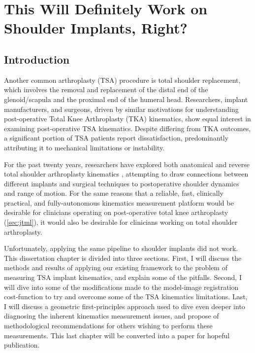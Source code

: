 \chapter{This Will Definitely Work on Shoulder Implants, Right?\protect\footnotemark}

\section{Introduction}
Another common arthroplasty (TSA) procedure is total shoulder replacement, which involves the removal and replacement of the distal end of the glenoid/scapula and the proximal end of the humeral head.
Researchers, implant manufacturers, and surgeons, driven by similar motivations for understanding post-operative Total Knee Arthroplasty (TKA) kinematics, show equal interest in examining post-operative TSA kinematics.
Despite differing from TKA outcomes, a significant portion of TSA patients report dissatisfaction, predominantly attributing it to mechanical limitations or instability.

For the past twenty years, researchers have explored both anatomical and reverse total shoulder arthroplasty kinematics \cite{kijimaVivo3dimensionalAnalysis2015,matsukiVivo3DAnalysis2014,matsukiDynamicVivoGlenohumeral2012,sugiComparingVivoThreedimensional2021,burtonFullyAutomaticTracking2023}, attempting to draw connections between different implants and surgical techniques to postoperative shoulder dynamics and range of motion.
For the same reasons that a reliable, fast, clinically practical, and fully-autonomous kinematics measurement platform would be desirable for clinicians operating on post-operative total knee arthroplasty (\cref{sec:jtml}), it would also be desirable for clinicians working on total shoulder arthroplasty.

Unfortunately, applying the same pipeline to shoulder implants did not work.
This dissertation chapter is divided into three sections.
First, I will discuss the methods and results of applying our existing framework to the problem of measuring TSA implant kinematics, and explain some of the pitfalls.
Second, I will dive into some of the modifications made to the model-image registration cost-function to try and overcome some of the TSA kinematics limitations.
Last, I will discuss a geometric first-principles approach used to dive even deeper into diagnosing the inherent kinematics measurement issues, and propose of methodological recommendations for others wishing to perform these measurements.
This last chapter will be converted into a paper for hopeful publication.

